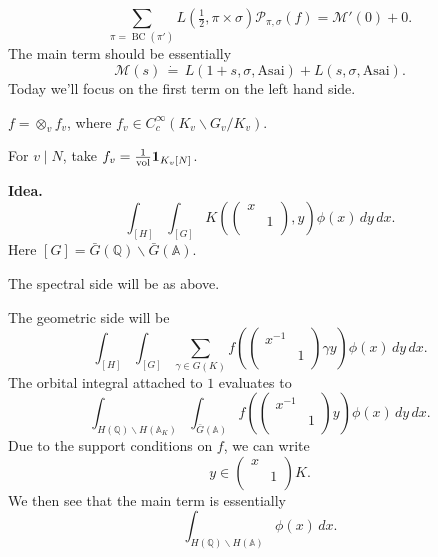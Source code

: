 \documentclass[reqno]{amsart} 
\begin{document}
\begin{equation*}
  \sum_{\pi = \operatorname{BC}(\pi ')}
  L(\tfrac{1}{2}, \pi \times \sigma)
  \mathcal{P}_{\pi, \sigma}(f) = \mathcal{M} '(0) + 0.
\end{equation*}
The main term should be essentially
\begin{equation*}
  \mathcal{M}(s) \, \dot{=} \, L(1 + s, \sigma, \mathrm{Asai})
  + L(s, \sigma, \mathrm{Asai}).
\end{equation*}
Today we'll focus on the first term on the left hand side.

$f = \otimes_v f_v$, where $f_v \in C_c^\infty(K_v \backslash G_v / K_v)$.

For $v \mid N$, take $f_v = \frac{1}{\operatorname{vol}} \mathbf{1}_{K_v [N]}$.

\textbf{Idea.}
\begin{equation*}
  \int_{[H]}
  \int_{[G]}
  K \left(
    \begin{pmatrix}
      x      &  \\
             & 1 \\
    \end{pmatrix}, y \right)
  \phi(x) \, d y \,d x.
\end{equation*}
Here $[G] = \bar{G}(\mathbb{Q}) \backslash \bar{G}(\mathbb{A})$.

The spectral side will be as above.

The geometric side will be
\begin{equation*}
  \int_{[H]} \int_{[G]}
  \sum_{\gamma \in G(K)} f \left(
    \begin{pmatrix}
      x^{-1}       &  \\
                   & 1 \\
    \end{pmatrix} \gamma y \right)
  \phi(x) \, d y \,d x.
\end{equation*}
The orbital integral attached to $1$ evaluates to
\begin{equation*}
  \int_{H(\mathbb{Q}) \backslash H(\mathbb{A}_K)} \int_{\bar{G}(\mathbb{A})} f \left(
    \begin{pmatrix}
      x^{-1}       &  \\
                   & 1 \\
    \end{pmatrix}
    y
  \right)
  \phi(x) \,d y \,d x.
\end{equation*}
Due to the support conditions on $f$, we can write
\begin{equation*}
  y \in
  \begin{pmatrix}
    x    &  \\
         & 1 \\
  \end{pmatrix} K.
\end{equation*}
We then see that the main term is essentially
\begin{equation*}
  \int_{H(\mathbb{Q}) \backslash H(\mathbb{A})} \phi(x) \,d x.
\end{equation*}
\end{document}
